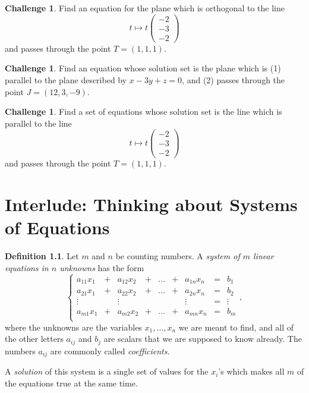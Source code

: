 \documentclass{tufte-book}
\theoremstyle{definition}
\newtheorem{challenge}[task]{Challenge}
\newtheorem*{definition}{Definition}
\begin{document}
\begin{challenge}
Find an equation for the plane which is orthogonal to the line 
\[
t\mapsto t \begin{pmatrix} -2\\-3\\-2\end{pmatrix}
\]
and passes through the point $T = (1,1,1)$.
\end{challenge}

\begin{challenge}
Find an equation whose solution set is the plane which is (1) parallel to the plane described by $x-3y+z=0$, and (2) passes through the point $J = (12,3,-9)$.
\end{challenge}

\begin{challenge}
Find a set of equations whose solution set is the line which is parallel to the line 
\[
t\mapsto t \begin{pmatrix} -2\\-3\\-2\end{pmatrix}
\]
and passes through the point $T = (1,1,1)$.
\end{challenge}

\chapter{Interlude: Thinking about Systems of Equations}

\begin{definition}
Let $m$ and $n$ be counting numbers. A \emph{system of $m$ linear equations in $n$ unknowns} has the form
\[
\left\{\begin{array}{rrrrrrrrr}
a_{11} x_1 & + & a_{12} x_2 & + & \dots & + & a_{1n} x_n & = & b_1 \\
a_{21} x_1 & + & a_{22} x_2 & + & \dots & + & a_{2n} x_n & = & b_2 \\
\vdots & & \vdots & & & & \vdots & = & \vdots \\
a_{m1} x_1 & + & a_{m2} x_2 & + & \dots & + & a_{mn} x_n & = & b_m \\

\end{array}\right. ,
\]
where the unknowns are the variables $x_1, \ldots, x_n$ we are meant to find, and
all of the other letters $a_{ij}$ and $b_j$ are scalars that we are supposed to know already. The numbers $a_{ij}$ are commonly called \emph{coefficients}.

A \emph{solution} of this system is a single set of values for the $x_i$'s which makes 
all $m$ of the equations true at the same time.
\end{definition}
\end{document}

